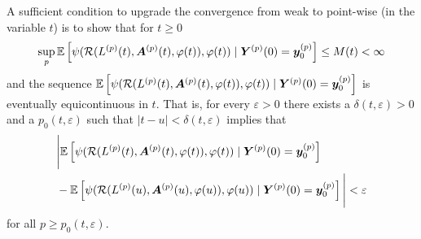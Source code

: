 A sufficient condition to upgrade the convergence from weak to point-wise (in the variable \(t\)) is to show that for \(t\geq 0\) 
\[\sup_{p}\mathbb E\left[\psi( \mathcal R(L^{(p)}(t),\boldsymbol A^{(p)}(t),\varphi(t)),\varphi(t) )  \mid \boldsymbol Y^{(p)}(0)=\boldsymbol y_0^{(p)} \right]  \leq M(t)<\infty\]
and the sequence \(\mathbb E\left[\psi( \mathcal R(L^{(p)}(t),\boldsymbol A^{(p)}(t),\varphi(t)),\varphi(t) )   \mid \boldsymbol Y^{(p)}(0)=\boldsymbol y_0^{(p)} \right]  \) is eventually equicontinuous in \(t\). That is, for every \(\varepsilon>0\) there exists a \(\delta(t,\varepsilon)>0\) and a \(p_0(t,\varepsilon)\) such that \(|t-u|<\delta(t,\varepsilon)\) implies that 
\begin{align}
	&\nonumber \Bigg|\mathbb E\left[\psi( \mathcal R(L^{(p)}(t),\boldsymbol A^{(p)}(t),\varphi(t)),\varphi(t) )   \mid \boldsymbol Y^{(p)}(0)=\boldsymbol y_0^{(p)} \right] 
	\\&{}-\mathbb E\left[\psi( \mathcal R(L^{(p)}(u),\boldsymbol A^{(p)}(u),\varphi(u)),\varphi(u) )   \mid \boldsymbol Y^{(p)}(0)=\boldsymbol y_0^{(p)}\right] \Bigg| \nonumber 
	<\varepsilon
\end{align}
for all \(p\geq p_0(t,\varepsilon)\). 

